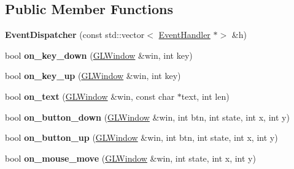 \subsection*{Public Member Functions}
\begin{DoxyCompactItemize}
\item 
\mbox{\label{classglwindow_1_1_event_dispatcher_af6bc815caa60cb9c6781db5f0756e414}} 
{\bfseries Event\+Dispatcher} (const std\+::vector$<$ \hyperlink{structglwindow_1_1_event_handler}{Event\+Handler} $\ast$$>$ \&h)
\item 
\mbox{\label{classglwindow_1_1_event_dispatcher_a101905128b1a416fbd9bf1adab9bcc44}} 
bool {\bfseries on\+\_\+key\+\_\+down} (\hyperlink{classglwindow_1_1_g_l_window}{G\+L\+Window} \&win, int key)
\item 
\mbox{\label{classglwindow_1_1_event_dispatcher_ac75bcbcdd9411c5f84b99764da2206a4}} 
bool {\bfseries on\+\_\+key\+\_\+up} (\hyperlink{classglwindow_1_1_g_l_window}{G\+L\+Window} \&win, int key)
\item 
\mbox{\label{classglwindow_1_1_event_dispatcher_aeae6ae67e9384d2cec6058fc603d065c}} 
bool {\bfseries on\+\_\+text} (\hyperlink{classglwindow_1_1_g_l_window}{G\+L\+Window} \&win, const char $\ast$text, int len)
\item 
\mbox{\label{classglwindow_1_1_event_dispatcher_ab3484ee0cfdc125d1d25550b3065aa90}} 
bool {\bfseries on\+\_\+button\+\_\+down} (\hyperlink{classglwindow_1_1_g_l_window}{G\+L\+Window} \&win, int btn, int state, int x, int y)
\item 
\mbox{\label{classglwindow_1_1_event_dispatcher_a0ab408899d7b617c82623596a4f46e67}} 
bool {\bfseries on\+\_\+button\+\_\+up} (\hyperlink{classglwindow_1_1_g_l_window}{G\+L\+Window} \&win, int btn, int state, int x, int y)
\item 
\mbox{\label{classglwindow_1_1_event_dispatcher_a5669333f26e662e6afdb9aede5d6fd54}} 
bool {\bfseries on\+\_\+mouse\+\_\+move} (\hyperlink{classglwindow_1_1_g_l_window}{G\+L\+Window} \&win, int state, int x, int y)
$$
\end{DoxyCompactItemize}
